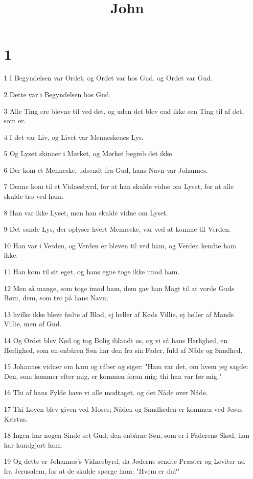 

\title{John}


\chapter{1}

\par 1 I Begyndelsen var Ordet, og Ordet var hos Gud, og Ordet var Gud.
\par 2 Dette var i Begyndelsen hos Gud.
\par 3 Alle Ting ere blevne til ved det, og uden det blev end ikke een Ting til af det, som er.
\par 4 I det var Liv, og Livet var Menneskenes Lys.
\par 5 Og Lyset skinner i Mørket, og Mørket begreb det ikke.
\par 6 Der kom et Menneske, udsendt fra Gud, hans Navn var Johannes.
\par 7 Denne kom til et Vidnesbyrd, for at han skulde vidne om Lyset, for at alle skulde tro ved ham.
\par 8 Han var ikke Lyset, men han skulde vidne om Lyset.
\par 9 Det sande Lys, der oplyser hvert Menneske, var ved at komme til Verden.
\par 10 Han var i Verden, og Verden er bleven til ved ham, og Verden kendte ham ikke.
\par 11 Han kom til sit eget, og hans egne toge ikke imod ham.
\par 12 Men så mange, som toge imod ham, dem gav han Magt til at vorde Guds Børn, dem, som tro på hans Navn;
\par 13 hvilke ikke bleve fødte af Blod, ej heller af Køds Villie, ej heller af Mands Villie, men af Gud.
\par 14 Og Ordet blev Kød og tog Bolig iblandt os, og vi så hans Herlighed, en Herlighed, som en enbåren Søn har den fra sin Fader, fuld af Nåde og Sandhed.
\par 15 Johannes vidner om ham og råber og siger: "Ham var det, om hvem jeg sagde: Den, som kommer efter mig, er kommen foran mig; thi han var før mig."
\par 16 Thi af hans Fylde have vi alle modtaget, og det Nåde over Nåde.
\par 17 Thi Loven blev given ved Moses; Nåden og Sandheden er kommen ved Jesus Kristus.
\par 18 Ingen har nogen Sinde set Gud; den enbårne Søn, som er i Faderens Skød, han har kundgjort ham.
\par 19 Og dette er Johannes's Vidnesbyrd, da Jøderne sendte Præster og Leviter ud fra Jerusalem, for at de skulde spørge ham: "Hvem er du?"
